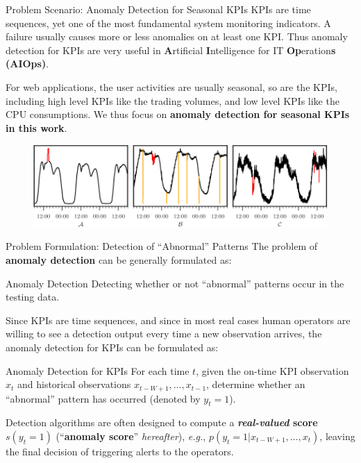 \documentclass[usenames,dvipsnames]{beamer}
\newcommand{\EG}{\textit{e.g.}}
\newcommand{\emphasis}[1]{\textbf{\textcolor{emphcolor}{#1}}}
\begin{document}
\begin{frame}{Problem Scenario: Anomaly Detection for Seasonal KPIs}
  KPIs are time sequences, yet one of the most fundamental system monitoring indicators.  A failure usually causes more or less anomalies on at least one KPI.  Thus anomaly detection for KPIs are very useful in \emphasis{A}rtificial \emphasis{I}ntelligence for IT \emphasis{Op}eration\emphasis{s} \emphasis{(AIOps)}.\vspace{0.5em}
  
  For web applications, the user activities are usually seasonal, so are the KPIs, including high level KPIs like the trading volumes, and low level KPIs like the CPU consumptions.  We thus focus on \emphasis{anomaly detection for seasonal KPIs in this work}.
  
  \begin{figure}
    \includegraphics[height=0.36\textheight]{kpi}  
  \end{figure}
\end{frame}

\begin{frame}{Problem Formulation: Detection of ``Abnormal'' Patterns}
  The problem of \emphasis{anomaly detection} can be generally formulated as:
  \begin{block}{Anomaly Detection}
    Detecting whether or not ``abnormal'' patterns occur in the testing data.
  \end{block}
  
  Since KPIs are time sequences, and since in most real cases human operators are willing to see a detection output every time a new observation arrives, the anomaly detection for KPIs can be formulated as:

  \begin{block}{Anomaly Detection for KPIs}
    For each time $t$, given the on-time KPI observation $x_t$ and historical observations $x_{t-W+1}, \dots, x_{t-1}$, determine whether an ``abnormal'' pattern has occurred (denoted by $y_t=1$).
  \end{block}
  
  Detection algorithms are often designed to compute a \emphasis{\textit{real-valued} score} $s(y_t=1)$ (``\emphasis{anomaly score}'' \textit{hereafter}), \EG{}, $p(y_t=1|x_{t-W+1},\dots,x_t)$, leaving the final decision of triggering alerts to the operators.
\end{frame}
\end{document}
